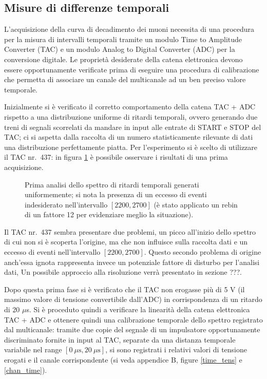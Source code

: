 \documentclass[10pt, oneside, a4paper]{article}   	%
\begin{document}
%
\subsection{Misure di differenze temporali}\label{tac}
L'acquisizione della curva di decadimento dei muoni necessita di una procedura per la misura di intervalli temporali tramite un modulo Time to Amplitude Converter (TAC) e un modulo Analog to Digital Converter (ADC) per la conversione digitale. Le proprietà desiderate della catena elettronica devono essere opportunamente verificate prima di eseguire una procedura di calibrazione che permetta di associare un canale del multicanale ad un ben preciso valore temporale.

Inizialmente si è verificato il corretto comportamento della catena TAC + ADC rispetto a una distribuzione uniforme di ritardi temporali, ovvero generando due treni di segnali scorrelati da mandare in input alle entrate di START e STOP del TAC; ci si aspetta dalla raccolta di un numero statisticamente rilevante di dati una distribuzione perfettamente piatta. Per l'esperimento si è scelto di utilizzare il TAC nr.~437: in figura \ref{rumore1} è possibile osservare i risultati di una prima acquisizione.
%
\begin{figure}[h]
  \centering  
  \begin{adjustbox}{width=10cm}
    
  \end{adjustbox}%
  \caption{Prima analisi dello spettro di ritardi temporali generati uniformemente; si nota la presenza di un eccesso di eventi indesiderato nell'intervallo $[2200,2700]$ (è stato applicato un rebin di un fattore 12 per evidenziare meglio la situazione).}
  \label{rumore1}
\end{figure}
%

Il TAC nr.~437 sembra presentare due problemi, un picco all'inizio dello spettro di cui non si è scoperta l'origine, ma che non influisce sulla raccolta dati e un eccesso di eventi nell'intervallo $[2200,2700]$. Questo secondo problema di origine anch'essa ignota rappresenta invece un potenziale fattore di disturbo per l'analisi dati, Un possibile approccio alla risoluzione verrà presentato in sezione ???.

Dopo questa prima fase si è verificato che il TAC  non erogasse più di 5 V (il massimo valore di tensione convertibile dall'ADC) in corrispondenza di un ritardo di 20 $\mu$s. Si è proceduto quindi a verificare la linearità della catena elettronica TAC + ADC e ottenere quindi una calibrazione temporale dello spettro registrato dal multicanale: tramite due copie del segnale di un impulsatore opportunamente discriminato fornite in input al TAC, separate da una distanza temporale variabile nel range $[0 \ \mu \mbox{s},20 \ \mu \mbox{s}]$, si sono registrati i relativi valori di tensione erogati e il canale corrispondente (si veda appendice B, figure \ref{time_tens} e \ref{chan_time}).
\end{document}
